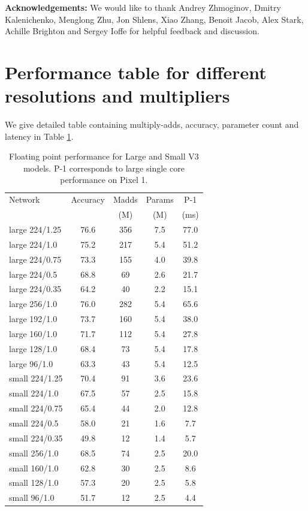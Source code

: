 \documentclass[10pt,twocolumn,letterpaper]{article}
\begin{document}
{\bf Acknowledgements:} We would like to thank Andrey Zhmoginov, Dmitry Kalenichenko, Menglong Zhu, Jon Shlens, Xiao Zhang, Benoit Jacob, Alex Stark, Achille Brighton and Sergey Ioffe for helpful feedback and discussion.

{\small


}

%
\appendix
\section{Performance table for different resolutions and multipliers}
We give detailed table containing multiply-adds,  accuracy, parameter count and
latency in Table \ref{tab:v3_stats}.
%
\begin{table}
    \centering
    \begin{tabular}{l|c|c|c|c}
\toprule[0.2em]
Network & Accuracy & Madds & Params & P-1 \\
&          & (M)   & (M) & (ms) \\
\hline
large 224/1.25  & 76.6 & 356 &  7.5 & 77.0 \\
large 224/1.0  & 75.2 & 217 &  5.4 & 51.2 \\
large 224/0.75  & 73.3 & 155 &  4.0 & 39.8 \\
large 224/0.5  & 68.8 & 69 &  2.6 & 21.7 \\
large 224/0.35  & 64.2 & 40 &  2.2 & 15.1 \\
large 256/1.0  & 76.0 & 282 &  5.4 & 65.6 \\
large 192/1.0  & 73.7 & 160 &  5.4 & 38.0 \\
large 160/1.0  & 71.7 & 112 &  5.4 & 27.8 \\
large 128/1.0  & 68.4 & 73 &  5.4 & 17.8 \\
large 96/1.0  & 63.3 & 43 &  5.4 & 12.5 \\
small 224/1.25  & 70.4 & 91 &  3.6 & 23.6 \\
small 224/1.0  & 67.5 & 57 &  2.5 & 15.8 \\
small 224/0.75  & 65.4 & 44 &  2.0 & 12.8 \\
small 224/0.5  & 58.0 & 21 &  1.6 & 7.7 \\
small 224/0.35  & 49.8 & 12 &  1.4 & 5.7 \\
small 256/1.0  & 68.5 & 74 &  2.5 & 20.0 \\
small 160/1.0  & 62.8 & 30 &  2.5 & 8.6 \\
small 128/1.0  & 57.3 & 20 &  2.5 & 5.8 \\
small 96/1.0  & 51.7 & 12 &  2.5 & 4.4 \\
\bottomrule
\end{tabular}
\caption{Floating point performance for Large and Small V3 models. P-1  corresponds to large single core performance on Pixel 1. }
\label{tab:v3_stats}
\end{table}
%
\end{document}
